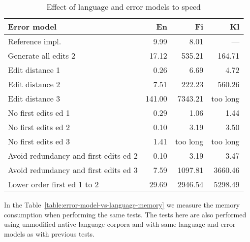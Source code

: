 \documentclass[11pt]{article}
\begin{document}
\begin{table}[h]
\begin{center}
\begin{scriptsize}
\begin{tabular}{|l|rrr|}
\hline
\bf Error model & \bf En & \bf Fi & \bf Kl \\ 
\hline
Reference impl. &
9.99&8.01
& --- \\
Generate all edits 2 & 
17.12&535.21&164.71
\\
\hline
Edit distance 1 &
0.26&6.69&4.72
\\
Edit distance 2 &
7.51&222.23&560.26
\\
Edit distance 3 &
141.00&7343.21&too long
\\
No first edits ed 1 & 
0.29&1.06&1.44
\\
No first edits ed 2 &
0.10&3.19&3.50
\\
No first edits ed 3 &
1.41&too long&too long
\\
Avoid redundancy and first edits ed 2 &
0.10&3.19&3.47
\\
Avoid redundancy and first edits ed 3 &
7.59&1097.81&3660.46
\\
Lower order first ed 1 to 2 &
29.69&2946.54&5298.49
\\
\hline
\end{tabular}
\end{scriptsize}
\end{center}
\caption{\label{table:error-model-vs-language-speed} Effect of language and 
error models to speed}
\end{table}

In the Table~\ref{table:error-model-vs-language-memory} we measure the memory
consumption when performing the same tests. The tests here are also performed
using unmodified native language corpora and with same language and error
models as with previous tests.
\end{document}
